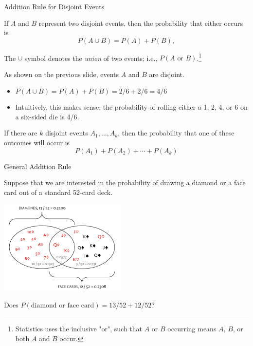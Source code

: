 \documentclass[ignorenonframetext,aspectratio=169]{beamer}
\begin{document}
\begin{frame}{Addition Rule for Disjoint Events}

If \(A\) and \(B\) represent two disjoint events, then the probability
that either occurs is \[P(A \cup B) = P(A) + P(B), \]

The \(\cup\) symbol denotes the \emph{union} of two events; i.e.,
\(P(A \text{ or } B)\).\footnote{Statistics uses the inclusive "or", such that $A$ or $B$ occurring means $A$, $B$, or both $A$ and $B$ occur.}

As shown on the previous slide, events \(A\) and \(B\) are disjoint.

\begin{itemize}
\item
  \(P(A \cup B) = P(A) + P(B) = 2/6 + 2/6 = 4/6\)
\item
  Intuitively, this makes sense; the probability of rolling either a 1,
  2, 4, or 6 on a six-sided die is 4/6.
\end{itemize}

If there are \(k\) disjoint events \(A_1,\dots,A_k\), then the
probability that one of these outcomes will occur is
\[P(A_1) + P(A_2) + \cdots + P(A_k)\]

\end{frame}

\begin{frame}{General Addition Rule}

Suppose that we are interested in the probability of drawing a diamond
or a face card out of a standard 52-card deck.

\begin{center}
\includegraphics[width=2.5in]{figures/cardsDiamondFaceVenn.png}
\end{center}

Does \(P(\text{diamond or face card}) = 13/52 + 12/52\)?

\end{frame}
\end{document}
